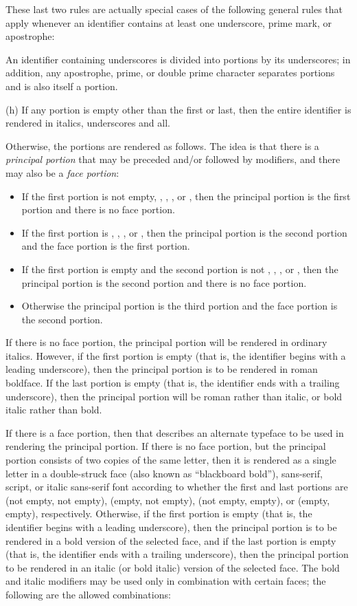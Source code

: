 These last two rules are actually special cases of the following general
rules that apply whenever an identifier contains at least one underscore,
prime mark, or apostrophe:

An identifier containing underscores is divided into portions by its underscores;
in addition, any apostrophe, prime, or double prime character
separates portions and is also itself a portion.

(h) If any portion is empty other than the first or last, then the entire identifier
is rendered in italics, underscores and all.

Otherwise, the
portions are rendered as follows.  The idea is that there is
a \emph{principal portion} that may be preceded and/or followed
by modifiers, and there may also be a \emph{face portion}:
\begin{itemize}
\item If the first portion is not empty, , , , or ,
then the principal portion is the first portion and there is no face portion.
\item If the first portion is , , , or ,
then the principal portion is the second portion and the face portion is the first portion.
\item If the first portion is empty and the second portion is not
, , , or ,
then the principal portion is the second portion and there is no face portion.
\item Otherwise the principal portion is the third portion and the face portion is the second portion.
\end{itemize}
If there is no face portion, the principal portion will be rendered in ordinary italics.
However, if the first portion is empty
(that is, the identifier begins with a leading underscore), then the
principal portion is to be rendered in roman boldface.
If the last portion is empty (that is, the identifier ends
with a trailing underscore), then the principal portion
will be roman rather than italic, or bold italic rather than bold.

If there is a face portion, then that describes an alternate typeface to be used
in rendering the principal portion.  If there is no face portion,
but the principal portion consists of two copies of the same letter,
then it is rendered as a single letter in a double-struck face
(also known as ``blackboard bold''), sans-serif, script, or italic sans-serif
font according to whether the first and last portions are (not empty, not
empty), (empty, not empty), (not empty, empty), or (empty, empty),
respectively.  Otherwise, if the first portion is empty
(that is, the identifier begins with a leading underscore), then the
principal portion is to be rendered in a bold version of the selected face,
and if the last portion is empty (that is, the identifier ends
with a trailing underscore), then the principal portion
to be rendered in an italic (or bold italic) version of the selected face.
The bold and italic modifiers may be used only in combination with certain faces; the
following are the allowed combinations:

